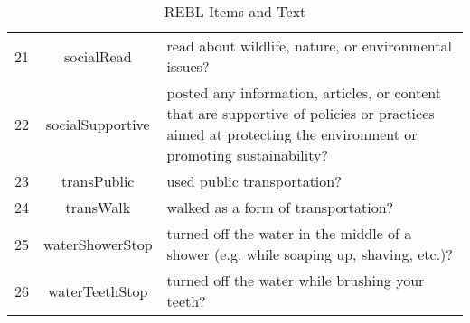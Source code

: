 \begin{table}[ht]
\begin{tabular}{ccp{7cm}}
  21 & socialRead & read about wildlife, nature, or environmental issues? \\ 
  22 & socialSupportive & posted any information, articles, or content that are supportive of policies or practices aimed at protecting the environment or promoting sustainability? \\ 
  23 & transPublic & used public transportation? \\ 
  24 & transWalk & walked as a form of transportation? \\ 
  25 & waterShowerStop & turned off the water in the middle of a shower (e.g. while soaping up, shaving, etc.)? \\ 
  26 & waterTeethStop & turned off the water while brushing your teeth? \\ 
   \hline
\end{tabular}
\endgroup
\caption{REBL Items and Text} 
\label{rebl_text}
\end{table}
